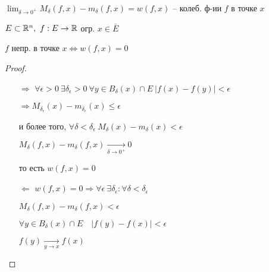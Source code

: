     \begin{definition}
        $\lim_{\delta \rightarrow 0^+} M_\delta(f, x) - m_\delta(f, x) = w(f, x)$ -- колеб. ф-ии $f$ в точке $x$
    \end{definition}

    \begin{lemma}
        $E \subset \mathbb{R}^n, \ f : E \rightarrow \mathbb{R}$ огр. \quad $x \in \bar E$
        \par $f$ непр. в точке $x \Leftrightarrow w(f, x) = 0$
    \end{lemma}
    \begin{proof}
        $ $


        \begin{enumerate}
            

            \item[$\boxed \Rightarrow$] $\forall \epsilon > 0 \ \exists \delta_\epsilon > 0 \ \forall y \in B_\delta(x) \cap E \ |f(x) - f(y)| < \epsilon$
                \par $\Rightarrow M_{\delta_\epsilon}(x) - m_{\delta_\epsilon}(x) \le \epsilon$
                \par и более того, $\forall \delta < \delta_\epsilon \ M_{\delta}(x) - m_{\delta}(x) < \epsilon$ \
                                \par $M_\delta(f, x) - m_\delta(f, x) \xrightarrow[\delta \rightarrow 0^+]{} 0$
                \par то есть $w(f, x) = 0$
            \item[$\boxed \Leftarrow$] $w(f, x) = 0 \Rightarrow \forall \epsilon \ \exists \delta_\epsilon : \forall \delta < \delta_\epsilon$
                \par $M_\delta(f, x) - m_\delta(f, x) < \epsilon$
                \par $\forall y \in B_\delta(x) \cap E \quad |f(y) - f(x)| < \epsilon$
                \par $f(y) \xrightarrow[y \rightarrow x]{} f(x)$
        \end{enumerate}


    \end{proof}

